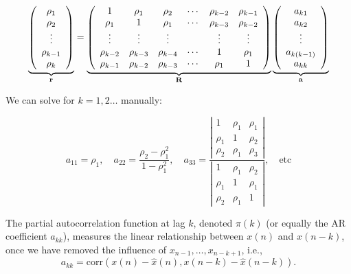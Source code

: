 \begin{equation}
\underbrace{
\left(\begin{array}{c}
\rho_1 \\
\rho_2 \\
\vdots \\
\rho_{k-1} \\
\rho_k
\end{array}\right)}_{\mathbf{r}} = 
\underbrace{\left(\begin{array}{cccccc}
1 & \rho_1 & \rho_2 & \cdots & \rho_{k-2} & \rho_{k-1} \\
\rho_1 & 1 & \rho_1 & \cdots & \rho_{k-3} & \rho_{k-2} \\
\vdots & \vdots & \vdots & & \vdots & \vdots \\
\rho_{k-2} & \rho_{k-3} & \rho_{k-4} & \cdots & 1 & \rho_1 \\
\rho_{k-1} & \rho_{k-2} & \rho_{k-3} & \cdots & \rho_1 & 1
\end{array}\right)}_{\mathbf{R}}
\underbrace{\left(\begin{array}{c}
a_{k1} \\
a_{k2} \\
\vdots \\
a_{k(k-1)} \\
a_{kk}
\end{array}\right)}_{\mathbf{a}}
\end{equation}

We can solve for $k=1,2\ldots$ manually:

\begin{equation}
    a_{11}=\rho_1,\quad a_{22}=\frac{\rho_2-\rho_1^2}{1-\rho_1^2},\quad a_{33}=\frac{\left|\begin{array}{ccc}1&\rho_1&\rho_1\\\rho_1&1&\rho_2\\\rho_2&\rho_1&\rho_3\end{array}\right|}{\left|\begin{array}{ccc}1&\rho_1&\rho_2\\\rho_1&1&\rho_1\\\rho_2&\rho_1&1\end{array}\right|},\quad\text{etc}
\end{equation}

The partial autocorrelation function at lag \( k \), denoted \(\pi(k)\) (or equally the AR coefficient \(a_{kk}\)), measures the linear relationship between \(x(n)\) and \(x(n - k)\), once we have removed the influence of \(x_{n-1}, \ldots, x_{n-k+1}\), i.e.,
\[
a_{kk} = \text{corr}\left(x(n) - \hat{x}(n), x(n - k) - \hat{x}(n - k)\right).
\]

